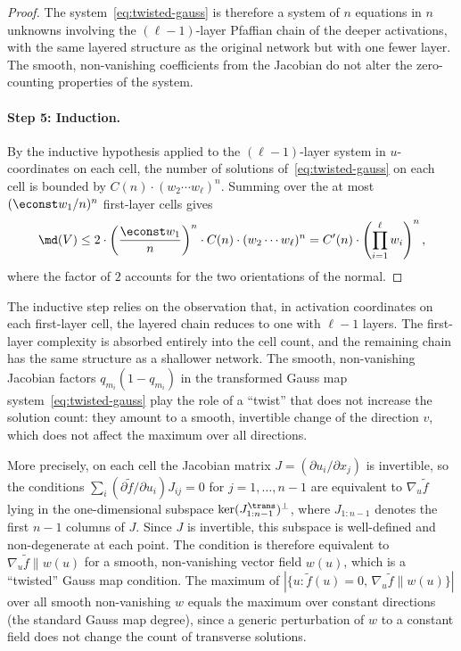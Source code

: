 \begin{proof}
The system~\eqref{eq:twisted-gauss} is therefore a system of $n$ equations in $n$ unknowns involving the $(\ell-1)$-layer Pfaffian chain of the deeper activations, with the same layered structure as the original network but with one fewer layer. The smooth, non-vanishing coefficients from the Jacobian do not alter the zero-counting properties of the system.

\paragraph{Step 5: Induction.}
By the inductive hypothesis applied to the $(\ell-1)$-layer system in $u$-coordinates on each cell, the number of solutions of~\eqref{eq:twisted-gauss} on each cell is bounded by $C(n)\cdot (w_2\cdots w_\ell)^n$. Summing over the at most $(\econst w_1/n)^n$ first-layer cells gives
\begin{equation*}
  \md(V) \leq 2\cdot \left(\frac{\econst w_1}{n}\right)^n \cdot C(n)\cdot (w_2\cdots w_\ell)^n = C'(n)\cdot \left(\prod_{i=1}^\ell w_i\right)^n,
\end{equation*}
where the factor of $2$ accounts for the two orientations of the normal.
\end{proof}

\begin{remark}\label{rem:induction-step}
The inductive step relies on the observation that, in activation coordinates on each first-layer cell, the layered chain reduces to one with $\ell-1$ layers. The first-layer complexity is absorbed entirely into the cell count, and the remaining chain has the same structure as a shallower network. The smooth, non-vanishing Jacobian factors $q_{m_i}(1-q_{m_i})$ in the transformed Gauss map system~\eqref{eq:twisted-gauss} play the role of a ``twist'' that does not increase the solution count: they amount to a smooth, invertible change of the direction $v$, which does not affect the maximum over all directions.

More precisely, on each cell the Jacobian matrix $J = (\partial u_i/\partial x_j)$ is invertible, so the conditions $\sum_i (\partial \tilde{f}/\partial u_i) J_{ij} = 0$ for $j = 1,\ldots,n-1$ are equivalent to $\nabla_u \tilde{f}$ lying in the one-dimensional subspace $\ker(J_{1:n-1}^\trans)^\perp$, where $J_{1:n-1}$ denotes the first $n-1$ columns of $J$. Since $J$ is invertible, this subspace is well-defined and non-degenerate at each point. The condition is therefore equivalent to $\nabla_u \tilde{f} \parallel w(u)$ for a smooth, non-vanishing vector field $w(u)$, which is a ``twisted'' Gauss map condition. The maximum of $|\{u : \tilde{f}(u)=0,\, \nabla_u \tilde{f} \parallel w(u)\}|$ over all smooth non-vanishing $w$ equals the maximum over constant directions (the standard Gauss map degree), since a generic perturbation of $w$ to a constant field does not change the count of transverse solutions.
\end{remark}

